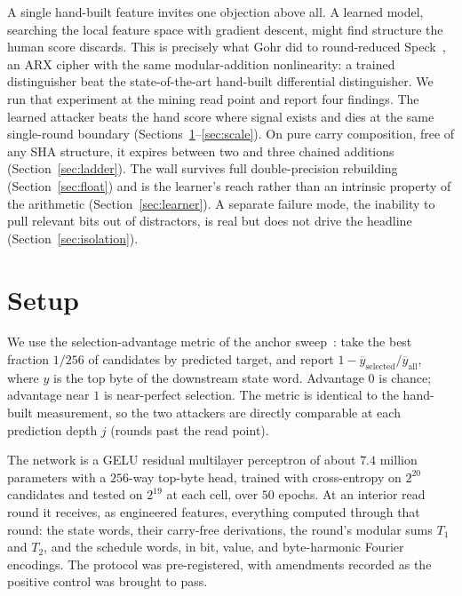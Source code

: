 \documentclass[11pt]{article}
\begin{document}
A single hand-built feature invites one objection above all. A learned
model, searching the local feature space with gradient descent, might find
structure the human score discards. This is precisely what Gohr did to
round-reduced Speck~\cite{gohr}, an ARX cipher with the same
modular-addition nonlinearity: a trained distinguisher beat the
state-of-the-art hand-built differential distinguisher. We run that
experiment at the mining read point and report four findings. The learned
attacker beats the hand score where signal exists and dies at the same
single-round boundary (Sections~\ref{sec:setup}--\ref{sec:scale}). On pure
carry composition, free of any SHA structure, it expires between two and
three chained additions (Section~\ref{sec:ladder}). The wall survives full
double-precision rebuilding (Section~\ref{sec:float}) and is the learner's
reach rather than an intrinsic property of the arithmetic
(Section~\ref{sec:learner}). A separate failure mode, the inability to pull
relevant bits out of distractors, is real but does not drive the headline
(Section~\ref{sec:isolation}).

\section{Setup}\label{sec:setup}

We use the selection-advantage metric of the anchor sweep~\cite{paperII}:
take the best fraction $1/256$ of candidates by predicted target, and
report $1 - \overline{y}_{\text{selected}}/\overline{y}_{\text{all}}$,
where $y$ is the top byte of the downstream state word. Advantage $0$ is
chance; advantage near $1$ is near-perfect selection. The metric is
identical to the hand-built measurement, so the two attackers are directly
comparable at each prediction depth $j$ (rounds past the read point).

The network is a GELU residual multilayer perceptron of about $7.4$ million
parameters with a $256$-way top-byte head, trained with cross-entropy on
$2^{20}$ candidates and tested on $2^{19}$ at each cell, over $50$ epochs.
At an interior read round it receives, as engineered features, everything
computed through that round: the state words, their carry-free
derivations, the round's modular sums $T_1$ and $T_2$, and the schedule
words, in bit, value, and byte-harmonic Fourier encodings. The protocol was
pre-registered, with amendments recorded as the positive control was
brought to pass.
\end{document}

